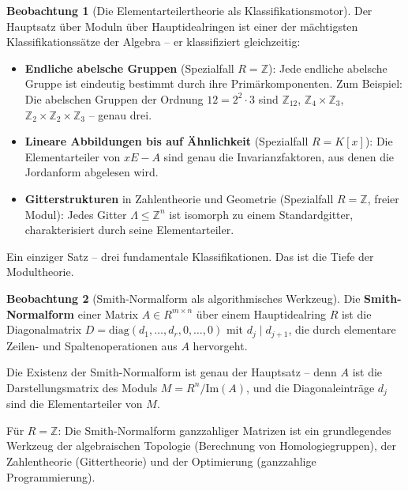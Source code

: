 ﻿\documentclass[a4paper,12pt]{report}
\theoremstyle{definition}
\newtheorem{beobachtung}{Beobachtung}
\begin{document}
\begin{beobachtung}[Die Elementarteilertheorie als Klassifikationsmotor]
    Der Hauptsatz über Moduln über Hauptidealringen ist einer der
    mächtigsten Klassifikationssätze der Algebra -- er klassifiziert
    gleichzeitig:
    \begin{itemize}
        \item[-] \textbf{Endliche abelsche Gruppen} (Spezialfall $R = \mathbb{Z}$):
              Jede endliche abelsche Gruppe ist eindeutig bestimmt
              durch ihre Primärkomponenten. Zum Beispiel:
              Die abelschen Gruppen der Ordnung $12 = 2^2 \cdot 3$ sind
              $\mathbb{Z}_{12}$, $\mathbb{Z}_4 \times \mathbb{Z}_3$,
              $\mathbb{Z}_2 \times \mathbb{Z}_2 \times \mathbb{Z}_3$ -- genau drei.
        \item[-] \textbf{Lineare Abbildungen bis auf Ähnlichkeit}
              (Spezialfall $R = K[x]$): Die Elementarteiler von $xE - A$
              sind genau die Invarianzfaktoren, aus denen die Jordanform
              abgelesen wird.
        \item[-] \textbf{Gitterstrukturen} in Zahlentheorie und Geometrie
              (Spezialfall $R = \mathbb{Z}$, freier Modul): Jedes
              Gitter $\Lambda \leq \mathbb{Z}^n$ ist isomorph zu einem
              Standardgitter, charakterisiert durch seine Elementarteiler.
    \end{itemize}
    Ein einziger Satz -- drei fundamentale Klassifikationen.
    Das ist die Tiefe der Modultheorie.
\end{beobachtung}

\begin{beobachtung}[Smith-Normalform als algorithmisches Werkzeug]
    Die \textbf{Smith-Normalform} einer Matrix $A \in R^{m \times n}$
    über einem Hauptidealring $R$ ist die Diagonalmatrix
    $D = \mathrm{diag}(d_1, \ldots, d_r, 0, \ldots, 0)$ mit
    $d_j \mid d_{j+1}$, die durch elementare Zeilen- und Spaltenoperationen
    aus $A$ hervorgeht.

    Die Existenz der Smith-Normalform ist genau der Hauptsatz -- denn
    $A$ ist die Darstellungsmatrix des Moduls $M = R^n / \mathrm{Im}(A)$,
    und die Diagonaleinträge $d_j$ sind die Elementarteiler von $M$.

    Für $R = \mathbb{Z}$: Die Smith-Normalform ganzzahliger Matrizen
    ist ein grundlegendes Werkzeug der algebraischen Topologie
    (Berechnung von Homologiegruppen), der Zahlentheorie (Gittertheorie)
    und der Optimierung (ganzzahlige Programmierung).
\end{beobachtung}
\end{document}
